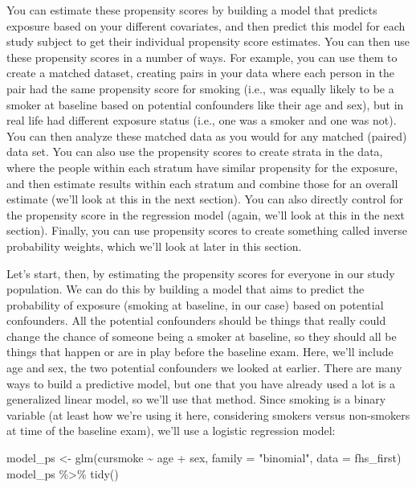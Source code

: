 \documentclass[
]{book}
\newenvironment{Shaded}{\begin{snugshade}}{\end{snugshade}}
\newcommand{\AttributeTok}[1]{\textcolor[rgb]{0.77,0.63,0.00}{#1}}
\newcommand{\FunctionTok}[1]{\textcolor[rgb]{0.00,0.00,0.00}{#1}}
\newcommand{\NormalTok}[1]{#1}
\newcommand{\OtherTok}[1]{\textcolor[rgb]{0.56,0.35,0.01}{#1}}
\newcommand{\SpecialCharTok}[1]{\textcolor[rgb]{0.00,0.00,0.00}{#1}}
\newcommand{\StringTok}[1]{\textcolor[rgb]{0.31,0.60,0.02}{#1}}
\begin{document}
You can estimate these propensity scores by building a model that predicts exposure based on your different covariates, and then predict this model for each study subject to get their individual propensity score estimates. You can then use these propensity scores in a number of ways. For example, you can use them to create a matched dataset, creating pairs in your data where each person in the pair had the same propensity score for smoking (i.e., was equally likely to be a smoker at baseline based on potential confounders like their age and sex), but in real life had different exposure status (i.e., one was a smoker and one was not). You can then analyze these matched data as you would for any matched (paired) data set. You can also use the propensity scores to create strata in the data, where the people within each stratum have similar propensity for the exposure, and then estimate results within each stratum and combine those for an overall estimate (we'll look at this in the next section). You can also directly control for the propensity score in the regression model (again, we'll look at this in the next section). Finally, you can use propensity scores to create something called inverse probability weights, which we'll look at later in this section.

Let's start, then, by estimating the propensity scores for everyone in our study population. We can do this by building a model that aims to predict the probability of exposure (smoking at baseline, in our case) based on potential confounders. All the potential confounders should be things that really could change the chance of someone being a smoker at baseline, so they should all be things that happen or are in play before the baseline exam. Here, we'll include age and sex, the two potential confounders we looked at earlier. There are many ways to build a predictive model, but one that you have already used a lot is a generalized linear model, so we'll use that method. Since smoking is a binary variable (at least how we're using it here, considering smokers versus non-smokers at time of the baseline exam), we'll use a logistic regression model:

\begin{Shaded}
\begin{Highlighting}[]
\NormalTok{model\_ps }\OtherTok{\textless{}{-}} \FunctionTok{glm}\NormalTok{(cursmoke }\SpecialCharTok{\textasciitilde{}}\NormalTok{ age }\SpecialCharTok{+}\NormalTok{ sex, }
                \AttributeTok{family =} \StringTok{"binomial"}\NormalTok{, }\AttributeTok{data =}\NormalTok{ fhs\_first)}
\NormalTok{model\_ps }\SpecialCharTok{\%\textgreater{}\%} 
  \FunctionTok{tidy}\NormalTok{()}
\end{Highlighting}
\end{Shaded}
\end{document}

